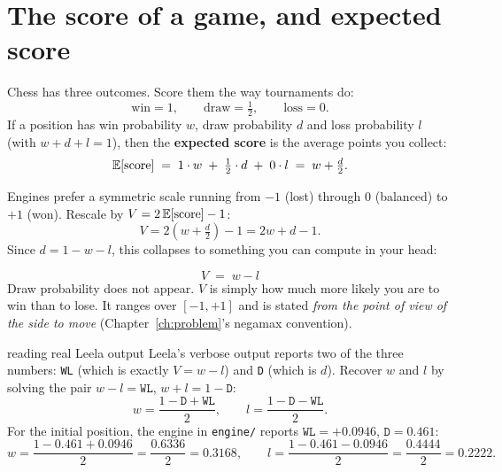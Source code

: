 \section{The score of a game, and expected score}

Chess has three outcomes. Score them the way tournaments do:
\[
  \text{win} = 1, \qquad \text{draw} = \tfrac12, \qquad \text{loss} = 0 .
\]
If a position has win probability $w$, draw probability $d$ and loss probability $l$ (with
$w + d + l = 1$), then the \textbf{expected score} is the average points you collect:
\begin{equation}
  \label{eq:expscore}
  \mathbb{E}[\text{score}] \;=\; 1\cdot w \;+\; \tfrac12 \cdot d \;+\; 0 \cdot l
  \;=\; w + \tfrac{d}{2}.
\end{equation}

Engines prefer a symmetric scale running from $-1$ (lost) through $0$ (balanced) to $+1$
(won). Rescale by $V = 2\,\mathbb{E}[\text{score}] - 1$:
\[
V = 2\left(w + \tfrac{d}{2}\right) - 1 = 2w + d - 1 .
\]
Since $d = 1 - w - l$, this collapses to something you can compute in your head:

\begin{finalform}
\begin{equation}
  \label{eq:VfromWDL}
  \boxed{\;V \;=\; w - l\;}
\end{equation}
Draw probability does not appear. $V$ is simply how much more likely you are to win than to
lose. It ranges over $[-1,+1]$ and is stated \emph{from the point of view of the side to
move} (Chapter~\ref{ch:problem}'s negamax convention).
\end{finalform}

\begin{worked}{reading real Leela output}
Leela's verbose output reports two of the three numbers: \texttt{WL} (which is exactly
$V = w-l$) and \texttt{D} (which is $d$). Recover $w$ and $l$ by solving the pair
$w - l = \texttt{WL}$, $w + l = 1 - \texttt{D}$:
\begin{equation}
  \label{eq:recoverwdl}
  w = \frac{1 - \texttt{D} + \texttt{WL}}{2}, \qquad
  l = \frac{1 - \texttt{D} - \texttt{WL}}{2}.
\end{equation}
For the initial position, the engine in \texttt{engine/} reports
$\texttt{WL} = +0.0946$, $\texttt{D} = 0.461$:
\[
w = \frac{1 - 0.461 + 0.0946}{2} = \frac{0.6336}{2} = 0.3168, \qquad
l = \frac{1 - 0.461 - 0.0946}{2} = \frac{0.4444}{2} = 0.2222 .
\]
\end{worked}

